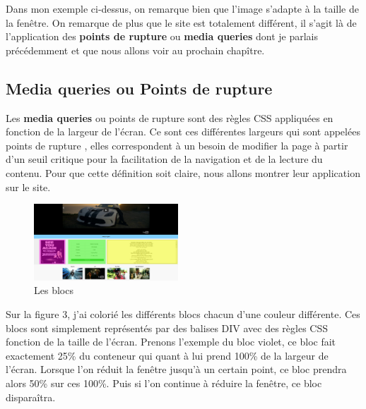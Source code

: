 \documentclass{article}
\begin{document}
Dans mon exemple ci-dessus, on remarque bien que l'image s'adapte \`a la taille de la fen\^etre. On remarque de plus que le site est totalement diff\'erent, il s'agit l\`a de l'application des \textbf{points de rupture} ou \textbf{media queries} dont je parlais pr\'ec\'edemment et que nous allons voir au prochain chap\^itre.

\subsection{Media queries ou Points de rupture}

Les \textbf{media queries} ou points de rupture sont des r\`egles CSS appliqu\'ees en fonction de la largeur de l'\'ecran. Ce sont ces diff\'erentes largeurs qui sont appel\'ees \og points de rupture \fg{}, elles correspondent \`a un besoin de modifier la page \`a partir d'un seuil critique pour la facilitation de la navigation et de la lecture du contenu. Pour que cette d\'efinition soit claire, nous allons montrer leur application sur le site. \\

\begin{figure}
  \vspace{-20pt}
  \begin{center}
    \includegraphics[width=0.48\textwidth]{p5}
  \end{center}
  \vspace{-20pt}
  \caption{Les blocs}
  \vspace{-10pt}
\end{figure} 

Sur la figure 3, j'ai colori\'e les diff\'erents blocs chacun d'une couleur diff\'erente. Ces blocs sont simplement repr\'esent\'es par des balises DIV avec des r\`egles CSS fonction de la taille de l'\'ecran. Prenons l'exemple du bloc violet, ce bloc fait exactement 25\% du conteneur qui quant \`a lui prend 100\% de la largeur de l'\'ecran. Lorsque l'on r\'eduit la fen\^etre jusqu'\`a un certain point, ce bloc prendra alors 50\% sur ces 100\%. Puis si l'on continue \`a r\'eduire la fen\^etre, ce bloc dispara\^itra.\\  
\end{document}
